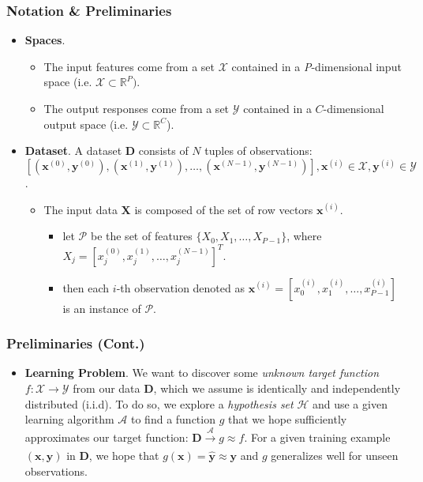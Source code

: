 \begin{frame}\frametitle{Notation \& Preliminaries}
	\begin{itemize}
		\item \textbf{Spaces}.  
			\begin{itemize}
				\item The input features come from a set  $\mathcal{X}$ contained in a \textit{P}-dimensional input space (i.e. $\mathcal{X} \subset \mathbb{R}^P)$.  
				\item The output responses come from a set $\mathcal{Y}$ contained in a $C$-dimensional output space (i.e. $\mathcal{Y} \subset \mathbb{R}^C$).
			\end{itemize}	
			\bigskip	
		\item \textbf{Dataset}. A dataset $\mathbf{D}$ consists of $N$ tuples of observations:\\ $[(\mathbf{x}^{(0)},\mathbf{y}^{(0)}), (\mathbf{x}^{(1)},\mathbf{y}^{(1)}), \dots, (\mathbf{x}^{(N-1)},\mathbf{y}^{(N-1)})], \mathbf{x}^{(i)} \in \mathcal{X}, \mathbf{y}^{(i)} \in \mathcal{Y}$.\\
			\begin{itemize}
			\item The input data $\mathbf{X}$ is composed of the set of row vectors $\mathbf{x}^{(i)}$. 
				\begin{itemize}
					\item let $\mathcal{P}$ be the set of features  $\{X_0, X_1, \dots, X_{P-1}\}$, where $X_j = \left[x_{j}^{(0)}, x_{j}^{(1)}, \dots, x_{j}^{(N-1)} \right]^T$.
					\item then each $i$-th observation denoted as $\mathbf{x}^{(i)} = \left[x_0^{(i)}, x_1^{(i)}, \dots, x_{P-1}^{(i)} \right]$ is an instance of $\mathcal{P}$.
				\end{itemize}
		\end{itemize}
	\end{itemize}
\end{frame}

\begin{frame}\frametitle{Preliminaries (Cont.)}
	\begin{itemize}
		\item \textbf{Learning Problem}. We want to discover some \textit{unknown target function} $f: \mathcal{X} \rightarrow \mathcal{Y}$ from our data $\mathbf{D}$, which we assume is identically and independently distributed (i.i.d).  To do so, we explore a \textit{hypothesis set} $\mathcal{H}$ and use a given learning algorithm $\mathcal{A}$ to find a function $g$ that we hope sufficiently approximates our target function: $\mathbf{D} \xrightarrow[]{\mathcal{A}} g \approx f$.  For a given training example $(\mathbf{x}, \mathbf{y})$ in $\mathbf{D}$, we hope that $g(\mathbf{x}) = \hat{\mathbf{y}} \approx \mathbf{y}$ and $g$ generalizes well for unseen observations.
	\end{itemize}
\end{frame}

